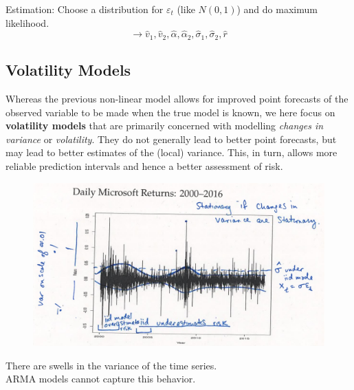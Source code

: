 Estimation: Choose a distribution for $\varepsilon_t$ (like $N(0,1)$) and do maximum likelihood. \[\rightarrow \hat{v}_1,\hat{v}_2,\hat{\alpha}, \hat{\alpha}_2, \hat{\sigma}_1, \hat{\sigma}_2, \hat{r}  \]

\subsection{Volatility Models}

Whereas the previous non-linear model allows for improved point forecasts of the observed variable to be made when the true model is known, we here focus on \textbf{volatility models} that are primarily concerned with modelling \textit{changes in variance} or \textit{volatility}. They do not generally lead to better point forecasts, but may lead to better estimates of the (local) variance. This, in turn, allows more reliable prediction intervals and hence a better assessment of risk. 

\begin{figure}[H]
\includegraphics[scale=0.4]{images/Screenshot 2024-05-13 at 09.11.00.jpg}
\centering
\end{figure}


There are swells in the variance of the time series. \\
ARMA models cannot capture this behavior. \\

